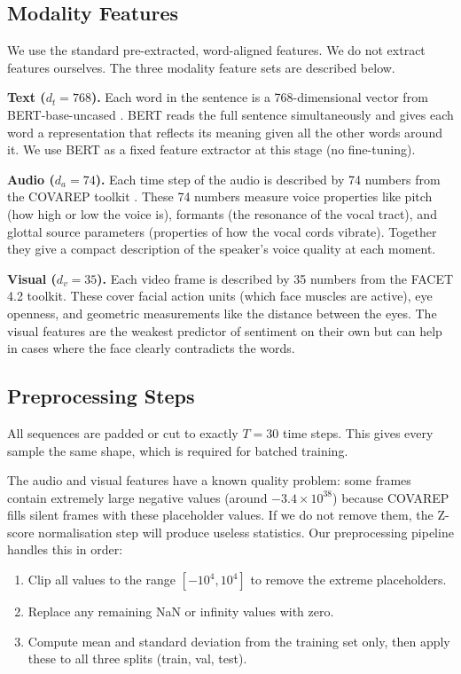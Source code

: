 \documentclass[11pt,twocolumn]{article}
\begin{document}
\subsection{Modality Features}

We use the standard pre-extracted, word-aligned features. We do not extract features ourselves. The three modality feature sets are described below.

\textbf{Text ($d_t = 768$).} Each word in the sentence is a 768-dimensional vector from BERT-base-uncased \citep{devlin2019bert}. BERT reads the full sentence simultaneously and gives each word a representation that reflects its meaning given all the other words around it. We use BERT as a fixed feature extractor at this stage (no fine-tuning).

\textbf{Audio ($d_a = 74$).} Each time step of the audio is described by 74 numbers from the COVAREP toolkit \citep{degottex2014covarep}. These 74 numbers measure voice properties like pitch (how high or low the voice is), formants (the resonance of the vocal tract), and glottal source parameters (properties of how the vocal cords vibrate). Together they give a compact description of the speaker's voice quality at each moment.

\textbf{Visual ($d_v = 35$).} Each video frame is described by 35 numbers from the FACET 4.2 toolkit. These cover facial action units (which face muscles are active), eye openness, and geometric measurements like the distance between the eyes. The visual features are the weakest predictor of sentiment on their own but can help in cases where the face clearly contradicts the words.

\subsection{Preprocessing Steps}

All sequences are padded or cut to exactly $T = 30$ time steps. This gives every sample the same shape, which is required for batched training.

The audio and visual features have a known quality problem: some frames contain extremely large negative values (around $-3.4 \times 10^{38}$) because COVAREP fills silent frames with these placeholder values. If we do not remove them, the Z-score normalisation step will produce useless statistics. Our preprocessing pipeline handles this in order:

\begin{enumerate}
    \item Clip all values to the range $[-10^4, 10^4]$ to remove the extreme placeholders.
    \item Replace any remaining NaN or infinity values with zero.
    \item Compute mean and standard deviation from the training set only, then apply these to all three splits (train, val, test).
\end{enumerate}
\end{document}
